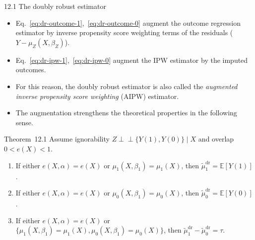 \documentclass[aspectratio=169, 12pt]{beamer}
\newcommand{\indep}{\perp\!\!\!\perp}
\newcommand{\E}{\mathbb{E}}
\begin{document}
\begin{frame}{12.1 The doubly robust estimator}
  \begin{itemize}
    \item Eq.~\eqref{eq:dr-outcome-1},~\eqref{eq:dr-outcome-0} augment the outcome regression estimator by inverse propensity score weighting terms of the residuals ($Y-\mu_Z(X,\beta_Z)$).
    \item Eq.~\eqref{eq:dr-ipw-1},~\eqref{eq:dr-ipw-0} augment the IPW estimator by the imputed outcomes.
    \item For this reason, the doubly robust estimator is also called the \textit{augmented inverse propensity score weighting} (AIPW) estimator.
    \item The augmentation strengthens the theoretical properties in the following sense.
  \end{itemize}
  \begin{keybox}{Theorem~12.1}
    Assume ignorability $Z\indep \{Y(1),Y(0)\}\mid X$ and overlap $0<e(X)<1$. 
    \begin{enumerate}
      \item If either $e(X,\alpha)=e(X)$ or $\mu_1(X,\beta_1)=\mu_1(X)$, then $\tilde{\mu}_1^{\text{dr}}=\E[Y(1)]$.
      \item If either $e(X,\alpha)=e(X)$ or $\mu_0(X,\beta_1)=\mu_0(X)$, then $\tilde{\mu}_0^{\text{dr}}=\E[Y(0)]$.
      \item If either $e(X,\alpha)=e(X)$ or $\{\mu_1(X,\beta_1)=\mu_1(X),\mu_0(X,\beta_1)=\mu_0(X)\}$, then $\tilde{\mu}_1^{\text{dr}} - \tilde{\mu}_0^{\text{dr}} = \tau.$
    \end{enumerate}
  \end{keybox}
\end{frame}
\end{document}
